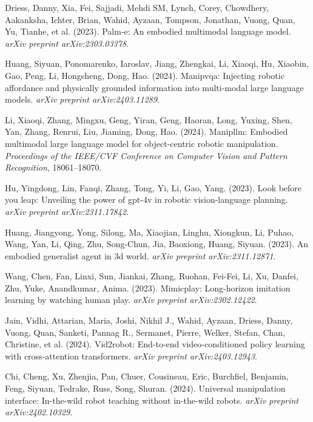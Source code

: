 \documentclass[a4paper]{article}
\begin{document}
\begin{thebibliography}{99}

Driess, Danny, Xia, Fei, Sajjadi, Mehdi SM, Lynch, Corey, Chowdhery, Aakanksha, Ichter, Brian, Wahid, Ayzaan, Tompson, Jonathan, Vuong, Quan, Yu, Tianhe, et al. (2023). Palm-e: An embodied multimodal language model. \textit{arXiv preprint arXiv:2303.03378}.

Huang, Siyuan, Ponomarenko, Iaroslav, Jiang, Zhengkai, Li, Xiaoqi, Hu, Xiaobin, Gao, Peng, Li, Hongsheng, Dong, Hao. (2024). Manipvqa: Injecting robotic affordance and physically grounded information into multi-modal large language models. \textit{arXiv preprint arXiv:2403.11289}.

Li, Xiaoqi, Zhang, Mingxu, Geng, Yiran, Geng, Haoran, Long, Yuxing, Shen, Yan, Zhang, Renrui, Liu, Jiaming, Dong, Hao. (2024). Manipllm: Embodied multimodal large language model for object-centric robotic manipulation. \textit{Proceedings of the IEEE/CVF Conference on Computer Vision and Pattern Recognition}, 18061--18070.

Hu, Yingdong, Lin, Fanqi, Zhang, Tong, Yi, Li, Gao, Yang. (2023). Look before you leap: Unveiling the power of gpt-4v in robotic vision-language planning. \textit{arXiv preprint arXiv:2311.17842}.

Huang, Jiangyong, Yong, Silong, Ma, Xiaojian, Linghu, Xiongkun, Li, Puhao, Wang, Yan, Li, Qing, Zhu, Song-Chun, Jia, Baoxiong, Huang, Siyuan. (2023). An embodied generalist agent in 3d world. \textit{arXiv preprint arXiv:2311.12871}.

Wang, Chen, Fan, Linxi, Sun, Jiankai, Zhang, Ruohan, Fei-Fei, Li, Xu, Danfei, Zhu, Yuke, Anandkumar, Anima. (2023). Mimicplay: Long-horizon imitation learning by watching human play. \textit{arXiv preprint arXiv:2302.12422}.

Jain, Vidhi, Attarian, Maria, Joshi, Nikhil J., Wahid, Ayzaan, Driess, Danny, Vuong, Quan, Sanketi, Pannag R., Sermanet, Pierre, Welker, Stefan, Chan, Christine, et al. (2024). Vid2robot: End-to-end video-conditioned policy learning with cross-attention transformers. \textit{arXiv preprint arXiv:2403.12943}.

Chi, Cheng, Xu, Zhenjia, Pan, Chuer, Cousineau, Eric, Burchfiel, Benjamin, Feng, Siyuan, Tedrake, Russ, Song, Shuran. (2024). Universal manipulation interface: In-the-wild robot teaching without in-the-wild robots. \textit{arXiv preprint arXiv:2402.10329}.


\end{thebibliography}
\end{document}
